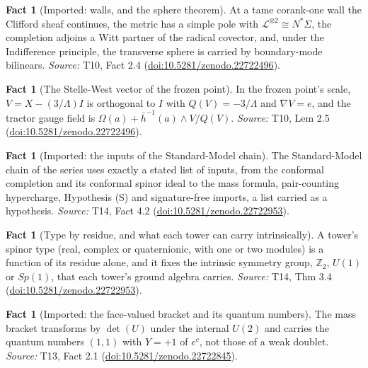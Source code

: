 \documentclass[11pt]{article}
\theoremstyle{definition}
\newtheorem{fact}[theorem]{Fact}
\theoremstyle{plain}
\providecommand{\Z}{}\renewcommand{\Z}{\mathbb{Z}}
\providecommand{\hb}{}\renewcommand{\hb}{\bar{h}}
\begin{document}
\begin{fact}[Imported: walls, and the sphere theorem]\label{c:dark-energy.imported-walls-sphere-theorem}
At a tame corank-one wall the Clifford sheaf continues, the metric has a simple pole with $\mathcal{L}^{\otimes 2} \cong N^*\Sigma$, the completion adjoins a Witt partner of the radical covector, and, under the Indifference principle, the transverse sphere is carried by boundary-mode bilinears.
\emph{Source:} T10, Fact 2.4 (\href{https://doi.org/10.5281/zenodo.22722496}{doi:10.5281/zenodo.22722496}).
\end{fact}

\begin{fact}[The Stelle-West vector of the frozen point]\label{c:dark-energy.stelle-west-vector-frozen-point}
In the frozen point's scale, $V = X - (3/\Lambda)I$ is orthogonal to $I$ with $Q(V) = -3/\Lambda$ and $\nabla V = e$, and the tractor gauge field is $\Omega(a) + \hb^{-1}(a)\wedge V/Q(V)$.
\emph{Source:} T10, Lem 2.5 (\href{https://doi.org/10.5281/zenodo.22722496}{doi:10.5281/zenodo.22722496}).
\end{fact}

\begin{fact}[Imported: the inputs of the Standard-Model chain]\label{c:dark-matter.imported-inputs-standard-model-chain}
The Standard-Model chain of the series uses exactly a stated list of inputs, from the conformal completion and its conformal spinor ideal to the mass formula, pair-counting hypercharge, Hypothesis (S) and signature-free imports, a list carried as a hypothesis.
\emph{Source:} T14, Fact 4.2 (\href{https://doi.org/10.5281/zenodo.22722953}{doi:10.5281/zenodo.22722953}).
\end{fact}

\begin{fact}[Type by residue, and what each tower can carry intrinsically]\label{c:dark-matter.type-residue-what-each-tower-can}
A tower's spinor type (real, complex or quaternionic, with one or two modules) is a function of its residue alone, and it fixes the intrinsic symmetry group, $\Z_{2}$, $U(1)$ or $Sp(1)$, that each tower's ground algebra carries.
\emph{Source:} T14, Thm 3.4 (\href{https://doi.org/10.5281/zenodo.22722953}{doi:10.5281/zenodo.22722953}).
\end{fact}

\begin{fact}[Imported: the face-valued bracket and its quantum numbers]\label{c:families.imported-face-valued-bracket-quantum-numbers}
The mass bracket transforms by $\det(U)$ under the internal $U(2)$ and carries the quantum numbers $(1,1)$ with $Y = +1$ of $e^{c}$, not those of a weak doublet.
\emph{Source:} T13, Fact 2.1 (\href{https://doi.org/10.5281/zenodo.22722845}{doi:10.5281/zenodo.22722845}).
\end{fact}
\end{document}
